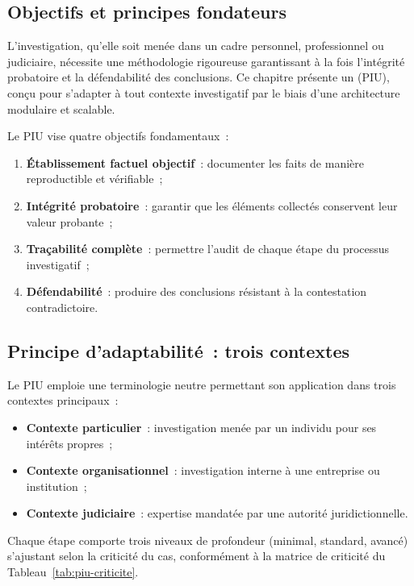 \subsection{Objectifs et principes fondateurs}

L'investigation, qu'elle soit menée dans un cadre personnel, professionnel ou
judiciaire, nécessite une méthodologie rigoureuse garantissant à la fois
l'intégrité probatoire et la défendabilité des conclusions. Ce chapitre
présente un  (PIU), conçu pour
s'adapter à tout contexte investigatif par le biais d'une architecture
modulaire et scalable.

Le PIU vise quatre objectifs fondamentaux~:
\begin{enumerate}
    \item \textbf{Établissement factuel objectif}~: documenter les faits de
          manière reproductible et vérifiable~;
    \item \textbf{Intégrité probatoire}~: garantir que les éléments collectés
          conservent leur valeur probante~;
    \item \textbf{Traçabilité complète}~: permettre l'audit de chaque étape
          du processus investigatif~;
    \item \textbf{Défendabilité}~: produire des conclusions résistant à la
          contestation contradictoire.
\end{enumerate}

\subsection{Principe d'adaptabilité~: trois contextes}

Le PIU emploie une terminologie neutre permettant son application dans trois
contextes principaux~:
\begin{itemize}
    \item \textbf{Contexte particulier}~: investigation menée par un individu
          pour ses intérêts propres~;
    \item \textbf{Contexte organisationnel}~: investigation interne à une
          entreprise ou institution~;
    \item \textbf{Contexte judiciaire}~: expertise mandatée par une autorité
          juridictionnelle.
\end{itemize}

Chaque étape comporte trois niveaux de profondeur (minimal, standard, avancé)
s'ajustant selon la criticité du cas, conformément à la matrice de criticité
du Tableau~\ref{tab:piu-criticite}.


